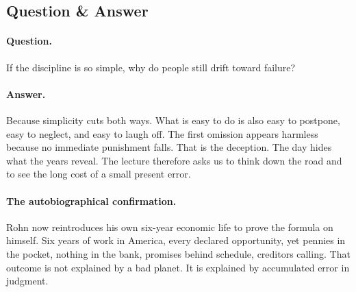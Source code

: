 \begin{figure}
\centering
{}
\end{figure}

\subsection{Question \& Answer}

\paragraph{Question.}
If the discipline is so simple, why do people still drift toward failure?

\paragraph{Answer.}
Because simplicity cuts both ways. What is easy to do is also easy to postpone, easy to neglect, and easy to laugh off. The first omission appears harmless because no immediate punishment falls. That is the deception. The day hides what the years reveal. The lecture therefore asks us to think down the road and to see the long cost of a small present error.

\paragraph{The autobiographical confirmation.}
Rohn now reintroduces his own six-year economic life to prove the formula on himself. Six years of work in America, every declared opportunity, yet pennies in the pocket, nothing in the bank, promises behind schedule, creditors calling. That outcome is not explained by a bad planet. It is explained by accumulated error in judgment.

